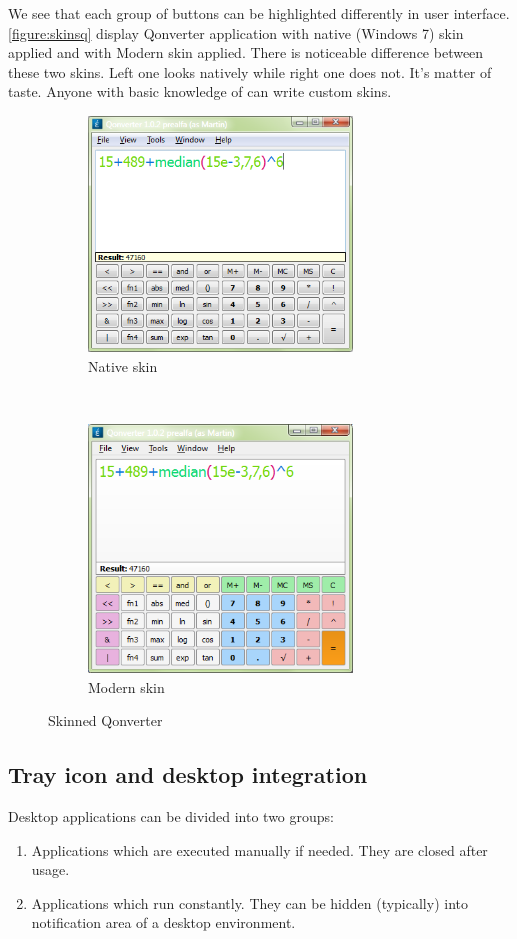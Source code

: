 We see that each group of buttons can be highlighted differently in user interface. \autoref{figure:skinsq} display Qonverter application with native (Windows 7) skin applied and with Modern skin applied. There is noticeable difference between these two skins. Left one looks natively while right one does not. It's matter of taste. Anyone with basic knowledge of  can write custom skins.

\begin{figure}[ht]
\centering
\begin{subfigure}[b]{0.48\textwidth}
\centering
\includegraphics[width=7cm]{graphics/real-world/00-qon-native}
\caption{Native skin}
\end{subfigure}
~
\begin{subfigure}[b]{0.48\textwidth}
\centering
\includegraphics[width=7cm]{graphics/real-world/00-qon-modern}
\caption{Modern skin}
\end{subfigure}
\caption{Skinned Qonverter}\label{figure:skinsq}
\end{figure}

\subsection{Tray icon and desktop integration}
Desktop applications can be divided into two groups:
\begin{enumerate}
\item Applications which are executed manually if needed. They are closed after usage.
\item Applications which run constantly. They can be hidden (typically) into notification area of a desktop environment.
\end{enumerate}

